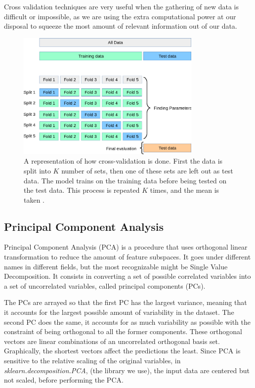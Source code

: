 	Cross validation techniques are very useful when the gathering of new data is difficult or impossible, as we are using the extra computational power at our disposal to squeeze the most amount of relevant information out of our data.

\begin{figure}[h]
    \centering
    \includegraphics[width=0.8\textwidth]{theory/figures/grid_search_cross_validation.png}
    \caption{A representation of how cross-validation is done. First the data is split into $K$ number of sets, then one of these sets are left out as test data. The model trains on the training data before being tested on the test data. This process is repeated $K$ times, and the mean is taken \cite{fig:cross_validation}.}
    \label{fig:cross-validation}
\end{figure}

\FloatBarrier
\subsection{Principal Component Analysis }\label{sec:PCA}
	Principal Component Analysis (\ac{PCA}) \cite{james2013introduction} is a procedure that uses orthogonal linear transformation to reduce the amount of feature subspaces. It goes under different names in different fields, but the most recognizable might be Single Value Decomposition. It consists in converting a set of possible correlated variables into a set of uncorrelated variables, called principal components (\ac{PC}s).
	
	The PCs are arrayed so that the first PC has the largest variance, meaning that it accounts for the largest possible amount of variability in the dataset. The second PC does the same, it accounts for as much variability as possible with the constraint of being orthogonal to all the former components. These orthogonal vectors are linear combinations of an uncorrelated orthogonal basis set. Graphically, the shortest vectors affect the predictions the least. Since PCA is sensitive to the relative scaling of the original variables, in \textit{sklearn.decomposition.PCA}, (the library we use), the input data are centered but not scaled, before performing the PCA.
	

